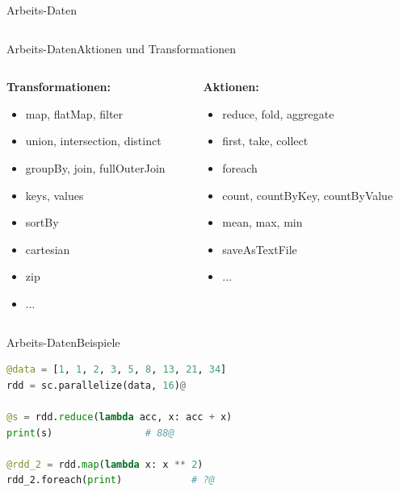 \begin{frame}{Arbeits-Daten}
\begin{columns}[t]
\begin{column}{0.45\textwidth}
{\begin{addmargin}[1em]{0em}
\begin{description}
					\end{description}
				\end{addmargin}
			}
		\end{column}
	\end{columns}
\end{frame}

\begin{frame}{Arbeits-Daten}{Aktionen und Transformationen}
	\begin{columns}[t]
		\begin{column}{0.45\textwidth}
			\textbf{Transformationen:}
			\begin{itemize}
				\item map, flatMap, filter
				\item union, intersection, distinct
				\item groupBy, join, fullOuterJoin
				\item keys, values
				\item sortBy
				\item cartesian
				\item zip
				\item ...
			\end{itemize}
		\end{column}
		\begin{column}{0.45\textwidth}
			\textbf{Aktionen:}
			\begin{itemize}
				\item reduce, fold, aggregate
				\item first, take, collect
				\item foreach
				\item count, countByKey, countByValue
				\item mean, max, min
				\item saveAsTextFile
				\item ...
			\end{itemize}
		\end{column}
	\end{columns}
\end{frame}

\begin{frame}[fragile]{Arbeits-Daten}{Beispiele}
	\begin{lstlisting}[language=python, style=animateblocks]
@data = [1, 1, 2, 3, 5, 8, 13, 21, 34]
rdd = sc.parallelize(data, 16)@

@s = rdd.reduce(lambda acc, x: acc + x)
print(s)				# 88@

@rdd_2 = rdd.map(lambda x: x ** 2)
rdd_2.foreach(print)			# ?@
	\end{lstlisting}
\end{frame}

